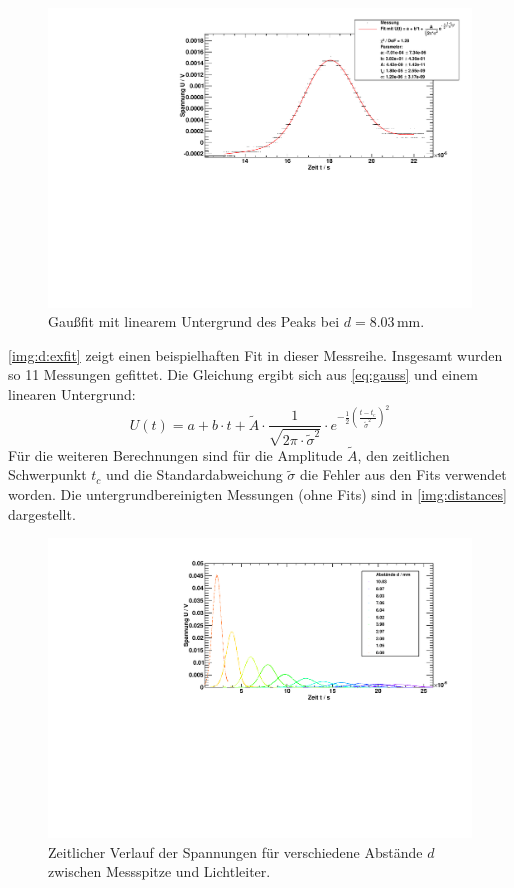 \begin{figure}[H]
\begin{center}
  \includegraphics[width=\textwidth]{../img/part2/dist02.pdf}
  \caption{Gaußfit mit linearem Untergrund des Peaks bei $d=8.03$\,mm.}
  \label{img:d:exfit}
\end{center}
\end{figure}
\autoref{img:d:exfit} zeigt einen beispielhaften Fit in dieser Messreihe. Insgesamt wurden so 11 Messungen gefittet. Die Gleichung ergibt sich 
aus \autoref{eq:gauss} und einem linearen Untergrund:
\begin{equation}
  U(t) = a + b \cdot t + \tilde{A} \cdot \frac{1}{\sqrt{2  \pi  \cdot \tilde{\sigma}^2}} \cdot
  e^{-\frac{1}{2} \left( \frac{t - t_{\text{c}}}{\tilde{\sigma}^2} \right)^2}
\end{equation}
Für die weiteren Berechnungen sind für die Amplitude $\tilde{A}$, den zeitlichen Schwerpunkt $t_c$ und die Standardabweichung
$\tilde{\sigma}$ die Fehler aus 
den Fits verwendet worden.
Die untergrundbereinigten Messungen (ohne Fits) sind in \autoref{img:distances} dargestellt.
\begin{figure}[H]
\begin{center}
  \includegraphics[width=\textwidth]{../img/part2/distances.pdf}
  \caption{Zeitlicher Verlauf der Spannungen für verschiedene Abstände $d$ zwischen Messspitze und Lichtleiter.}
  \label{img:distances}
\end{center}
\end{figure}

